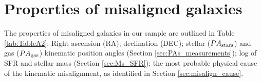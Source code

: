 \documentclass[fleqn,usenatbib]{mnras}
\begin{document}

\section{Properties of misaligned galaxies}
\label{A4}

The properties of misaligned galaxies in our sample are outlined in Table \ref{tab:TableA2}: Right ascension (RA); declination (DEC); stellar ($PA_{\rm{stars}}$) and gas ($PA_{\rm{gas}}$) kinematic position angles (Section \ref{sec:PAs_measurements}); log of SFR and stellar mass (Section \ref{sec:Ms_SFR}); the most probable physical cause of the kinematic misalignment, as identified in Section \ref{sec:misalign_cause}.


\setlength{\tabcolsep}{9.3pt} 
\renewcommand{\arraystretch}{1.2}
\end{document}
